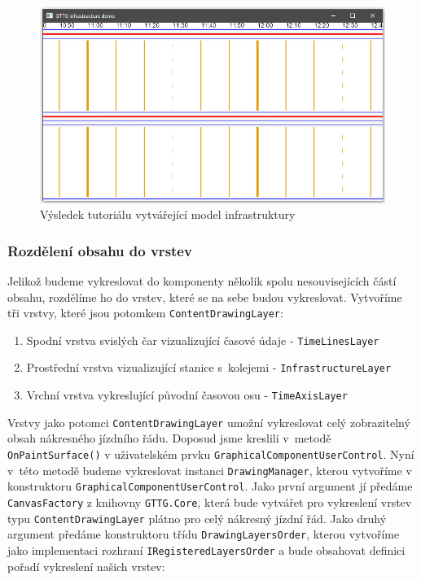 \begin{figure}[!hbt]
	\centering
	\includegraphics[width=.8\textwidth]{../img/kap5_tutorial_infrastructure_result}
	\caption{Výsledek tutoriálu vytvářející model infrastruktury}
	\label{fig:kap5:infrastructure_demo}
\end{figure}

\subsubsection*{Rozdělení obsahu do vrstev}
Jelikož budeme vykreslovat do komponenty několik spolu nesouvisejících částí obsahu, rozdělíme ho do vrstev, které se na sebe budou vykreslovat. Vytvoříme tři vrstvy, které jsou potomkem \texttt{ContentDrawingLayer}:

\begin{enumerate}
	\item Spodní vrstva svislých čar vizualizující časové údaje - \texttt{TimeLinesLayer}
	\item Prostřední vrstva vizualizující stanice s~kolejemi - \texttt{InfrastructureLayer}
	\item Vrchní vrstva vykreslující původní časovou osu - \texttt{TimeAxisLayer}
\end{enumerate}

Vrstvy jako potomci \texttt{ContentDrawingLayer} umožní vykreslovat celý zobrazitelný obsah nákresného jízdního řádu. Doposud jsme kreslili v~metodě \linebreak\texttt{OnPaintSurface()} v uživatelském prvku \texttt{GraphicalComponentUserControl}. \linebreak Nyní v~této metodě budeme vykreslovat instanci \texttt{DrawingManager}, kterou vytvoříme v konstruktoru \texttt{GraphicalComponentUserControl}. Jako první argument jí předáme \texttt{CanvasFactory} z knihovny \texttt{GTTG.Core}, která bude vytvářet pro vykreslení vrstev typu \texttt{ContentDrawingLayer} plátno pro celý nákresný jízdní řád. Jako druhý argument předáme konstruktoru třídu \texttt{DrawingLayersOrder}, kterou vytvoříme jako implementaci rozhraní \texttt{IRegisteredLayersOrder} a bude obsahovat definici pořadí vykreslení našich vrstev:


